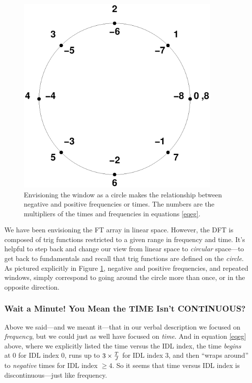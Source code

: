 \documentclass[psfig,preprint]{aastex}
\begin{document}
\begin{figure}[h!]
\begin{center}
\leavevmode
\includegraphics[width=4.0in]{ftfig1.ps}
\end{center}
\caption{Envisioning the window as a circle makes the relationship
between negative and positive frequencies or times. The numbers are the
multipliers of the times and frequencies in equations \ref{eqeg}.
\label{ftfig1} }
\end{figure}

\enlargethispage{0.4in}
\noindent We have been envisioning the FT array in linear space. 
However, the DFT is composed of trig functions restricted to a given
range in frequency and time.  It's helpful to step back and change our
view from linear space to {\it circular} space---to get back to
fundamentals and recall that trig functions are defined on the {\it
circle}.  As pictured explicitly in Figure \ref{ftfig1}, negative and
positive frequencies, and repeated windows, simply correspond to going
around the circle more than once, or in the opposite direction.

\subsubsection{Wait a Minute! You Mean the TIME Isn't CONTINUOUS?}

\label{noncontinuous}

	Above we said---and we meant it---that in our verbal description
we focused on {\it frequency}, but we could just as well have focused
on {\it time}. And in equation \ref{eqeg} above, where we explicitly listed
the time versus the IDL index, the time {\it begins} at $0$ for IDL
index 0, runs up to $3 \times {T \over J}$ for IDL index $3$,
and then ``wraps around'' to {\it negative} times for IDL index $\ge 4$.
So it seems that time versus IDL index is discontinuous---just like
frequency. 
\end{document}
